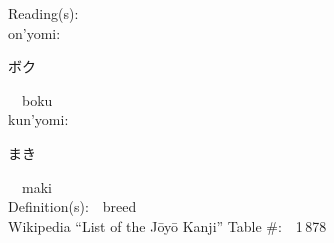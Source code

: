 \begin{multicols}{2}
Reading(s):\ \ \\
{\hspace*{1em}}on'yomi:\ \ \\
{\hspace*{2em}}{\begin{CJK}{UTF8}{min} ボク \end{CJK}}\ \ boku\ \ \\
{\hspace*{1em}}kun'yomi:\ \ \\
{\hspace*{2em}}{\begin{CJK}{UTF8}{min} まき \end{CJK}}\ \ maki\ \ \\
Definition(s):\ \ breed \\
Wikipedia ``List of the J\=oy\=o Kanji'' Table \#:\ \ 1\,878 \\
\ \ \\
\end{multicols}



